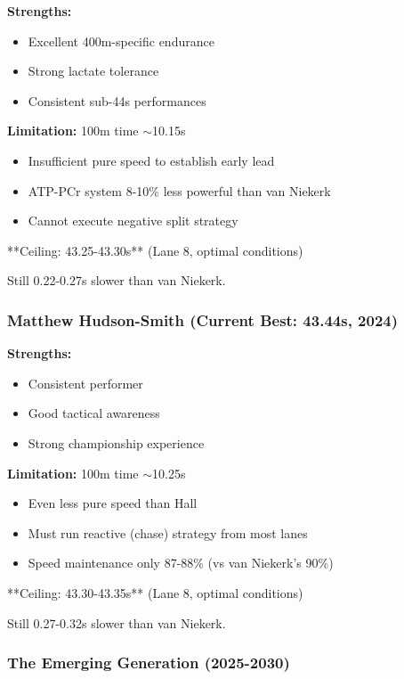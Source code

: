 \textbf{Strengths:}
\begin{itemize}
    \item Excellent 400m-specific endurance
    \item Strong lactate tolerance
    \item Consistent sub-44s performances
\end{itemize}

\textbf{Limitation:} 100m time $\sim$10.15s
\begin{itemize}
    \item Insufficient pure speed to establish early lead
    \item ATP-PCr system 8-10\% less powerful than van Niekerk
    \item Cannot execute negative split strategy
\end{itemize}

**Ceiling: 43.25-43.30s** (Lane 8, optimal conditions)

Still 0.22-0.27s slower than van Niekerk.

\subsubsection{Matthew Hudson-Smith (Current Best: 43.44s, 2024)}

\textbf{Strengths:}
\begin{itemize}
    \item Consistent performer
    \item Good tactical awareness
    \item Strong championship experience
\end{itemize}

\textbf{Limitation:} 100m time $\sim$10.25s
\begin{itemize}
    \item Even less pure speed than Hall
    \item Must run reactive (chase) strategy from most lanes
    \item Speed maintenance only 87-88\% (vs van Niekerk's 90\%)
\end{itemize}

**Ceiling: 43.30-43.35s** (Lane 8, optimal conditions)

Still 0.27-0.32s slower than van Niekerk.

\subsubsection{The Emerging Generation (2025-2030)}

